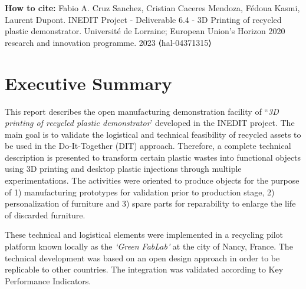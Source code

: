 \documentclass[
  11pt,
]{article}
\renewcommand*\contentsname{Table of contents}
\newcommand\contentsname{Table of contents}
\begin{document}
\textbf{How to cite:} \newline
Fabio A. Cruz Sanchez, Cristian Caceres Mendoza, Fédoua Kasmi, Laurent Dupont. 
INEDIT Project - Deliverable 6.4 - 3D Printing of recycled plastic demonstrator. 
Université de Lorraine; European Union’s Horizon 2020 research and innovation programme. 2023 ⟨hal-04371315⟩


\vfill
\newpage

\ifdefined\Shaded\renewenvironment{Shaded}{\begin{tcolorbox}[enhanced, boxrule=0pt, interior hidden, frame hidden, breakable, borderline west={3pt}{0pt}{shadecolor}, sharp corners]}{\end{tcolorbox}}\fi

\renewcommand*\contentsname{Table of contents}
{
\hypersetup{linkcolor=}
\setcounter{tocdepth}{3}
\tableofcontents
}
\newpage

\bgroup
\hypersetup{linkcolor = black}
\listoffigures
\egroup

\color{darkgray}

\newpage

\hypertarget{executive-summary}{%
\section{Executive Summary}\label{executive-summary}}

This report describes the open manufacturing demonstration facility of
``\emph{3D printing of recycled plastic demonstrator}' developed in the
INEDIT project. The main goal is to validate the logistical and
technical feasibility of recycled assets to be used in the
Do-It-Together (DIT) approach. Therefore, a complete technical
description is presented to transform certain plastic wastes into
functional objects using 3D printing and desktop plastic injections
through multiple experimentations. The activities were oriented to
produce objects for the purpose of 1) manufacturing prototypes for
validation prior to production stage, 2) personalization of furniture
and 3) spare parts for reparability to enlarge the life of discarded
furniture.

These technical and logistical elements were implemented in a recycling
pilot platform known locally as the \emph{`Green FabLab'} at the city of
Nancy, France. The technical development was based on an open design
approach in order to be replicable to other countries. The integration
was validated according to Key Performance Indicators.
\end{document}
